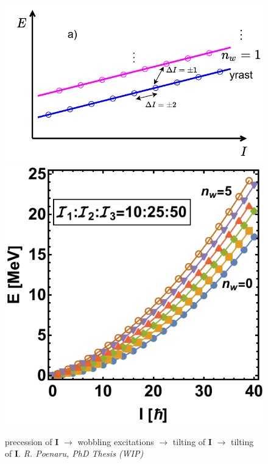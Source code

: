 \documentclass[
	11pt, %
]{beamer}
\begin{document}
\begin{frame}
\begin{figure}
	\end{figure}
	\vspace{-0.5cm}
	\begin{figure}
		\centering
		\includegraphics[scale=0.35]{figures/wobbling_n_schematic-1.pdf}
		\includegraphics[scale=0.35]{figures/wobblingFreq-evenA.pdf}
		\vspace{-0.3cm}
		\caption{precession of $\mathbf{I}$ $\rightarrow$ wobbling excitations $\rightarrow$ tilting of $\mathbf{I}$ $\rightarrow$ tilting of $\mathbf{I}$. \emph{R. Poenaru, PhD Thesis (WIP)}}
	\end{figure}
\end{frame}
\end{document}
